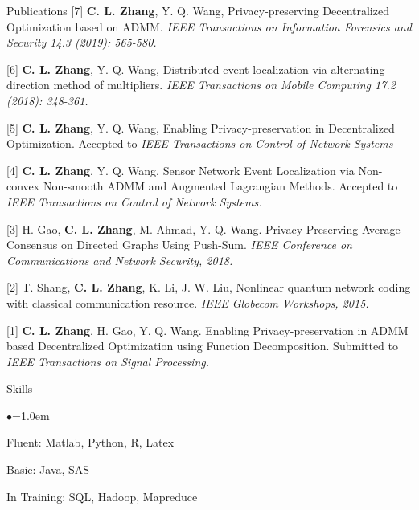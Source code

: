 \documentclass{resume} %
\begin{document}
\begin{rSection}{Publications}	
	[7] \textbf{C. L. Zhang}, Y. Q. Wang, Privacy-preserving Decentralized Optimization based on ADMM. \emph{IEEE Transactions on Information Forensics and Security 14.3 (2019): 565-580.}
	
	[6]	\textbf{C. L. Zhang}, Y. Q. Wang, Distributed event localization via alternating direction method of multipliers. \emph{IEEE Transactions on Mobile Computing 17.2 (2018): 348-361.}
	
	[5] \textbf{C. L. Zhang}, Y. Q. Wang, Enabling Privacy-preservation in Decentralized Optimization.  Accepted to \emph{IEEE Transactions on Control of Network Systems}
		
	[4] \textbf{C. L. Zhang}, Y. Q. Wang, Sensor Network Event Localization via Non-convex Non-smooth ADMM and Augmented Lagrangian Methods. Accepted to  \emph{IEEE Transactions on Control of Network Systems.}
	
	[3] H. Gao, \textbf{C. L. Zhang}, M. Ahmad, Y. Q. Wang. Privacy-Preserving Average Consensus on Directed Graphs Using Push-Sum.  \emph{IEEE Conference on Communications and Network Security, 2018.}
	
	[2] T. Shang, \textbf{C. L. Zhang}, K. Li, J. W. Liu, Nonlinear quantum network coding with classical
	communication resource.  \emph{IEEE Globecom Workshops, 2015.}
	
	[1] \textbf{C. L. Zhang}, H. Gao,  Y. Q. Wang. Enabling Privacy-preservation in ADMM based Decentralized Optimization using Function Decomposition. Submitted to \emph{IEEE Transactions on Signal Processing.}
\end{rSection}

\vspace{-0.15cm}
\begin{rSection}{Skills}
  \begin{list}{$\bullet$}{\leftmargin=1.0em}
  	\item Fluent: Matlab, Python, R, Latex 
  	\item Basic: Java, SAS 
  	\item In Training: SQL, Hadoop, Mapreduce 
  	\end{list}
\end{rSection}
\end{document}
